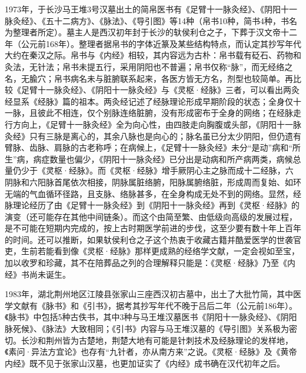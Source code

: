 \documentclass[draft,12pt]{ctexbook}
\begin{document}
1973年，于长沙马王堆3号汉墓出土的简帛医书有《足臂十一脉灸经》、《阴阳十一脉灸经》、《五十二病方》、《脉法》、《导引图》等14种（帛书10种，简书4种，书名为整理者所定）。墓主人是西汉初年封于长沙的轪侯利仓之子，下葬于汉文帝十二年（公元前168年）。整理者据帛书的字体近篆及某些结构特点，而认定其抄写年代大约在秦汉之际。帛书与《内经》相较，其内容远为古朴：帛书载有砭石、药物和灸法，无针法；帛书未提五行，采用阴阳也不普遍；帛书仅称“脉”，而无经络之名，无腧穴；帛书病名未与脏腑联系起来，各医方皆无方名，剂型也较简单。再比较《足臂十一脉灸经》、《阴阳十一脉灸经》与《灵枢·经脉》三者，可以看出两灸经显系《经脉》篇的祖本。两灸经记述了经脉理论形成早期阶段的状态；全身仅十一脉，且彼此不相连，仅个别脉连络脏腑，没有形成密布于全身的网络；在经脉走行方向上，《足臂十一脉灸经》全为向心性，由四肢走向胸腹或头部，《阴阳十一脉灸经》只有三脉是离心的，其余八脉也是向心的；脉名虽已分太少阴阳，但仍遗有臂脉、齿脉、肩脉的古老称呼；在病候上，《足臂十一脉灸经》未分“是动”病和“所生”病，病症数量也偏少，《阴阳十一脉灸经》已分出是动病和所产病两类，病候总量仍少于《灵枢·经脉》。而《灵枢·经脉》增手厥阴心主之脉而成十二经脉，六阴脉和六阳脉首尾依次相接，阴脉属脏络腑，阳脉属腑络脏，形成周而复始、如环无端的气血循环径路，且支脉、络脉甚多，在全身构成无处不到的网络。显然，经脉理论经历了由《足臂十一脉灸经》到《阴阳十一脉灸经》再到《灵枢·经脉》的演变（还可能存在其他中间链条）。而这个由简至繁、由低级向高级的发展过程，是不可能在短期内完成的，按上古时期医学前进的步伐，这至少要有数十年上百年的时间。还可以推断，如果轪侯利仓之子这个热衷于收藏古籍并酷爱医学的世袭官吏，生前若能看到像《灵枢·经脉》那样更成熟的经络学文献，一定会视如至宝，加以收罗和珍藏，其不在陪葬品之列的合理解释只能是：《灵枢·经脉》乃至《内经》书尚未诞生。

1983年，湖北荆州地区江陵县张家山三座西汉初古墓中，出土了大批竹简，其中医学文献有《脉书》和《引书》，据考其抄写年代不晚于吕后二年（公元前186年）。《脉书》中包括5种古佚书，其中3种与马王堆汉墓医书《阴阳十一脉灸经》、《阴阳脉死候》、《脉法》大致相同；《引书》内容与马王堆汉墓的《导引图》关系极为密切。长沙和荆州皆为古楚地，荆楚大地有可能是针刺技术及经脉理论的发样地，《素问·异法方宜论》也存有“九针者，亦从南方来”之说。《灵枢·经脉》及《黄帝内经》既不见于张家山汉墓，也更加证实了《内经》成书确在汉代初年之后。
\end{document}
